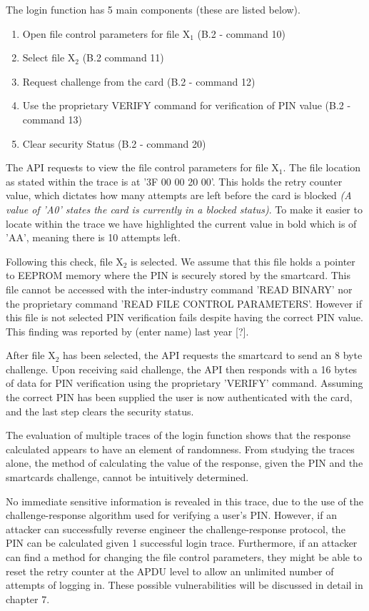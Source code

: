 \documentclass[bsc,frontabs,twoside,singlespacing,parskip,deptreport]{infthesis}     %
\begin{document}
The login function has 5 main components (these are listed below). 

\begin{enumerate}
\item Open file control parameters for file X$_1$ (B.2 - command 10)
\item Select file X$_2$ (B.2 command 11)
\item Request challenge from the card (B.2 - command 12)
\item Use the proprietary VERIFY command for verification of PIN value (B.2 - command 13)
\item Clear security Status (B.2 - command 20)\\
\end{enumerate}

The API requests to view the file control parameters for file X$_1$. The file location as stated within the trace is at '3F 00 00  20 00'. This holds the retry counter value, which dictates how many attempts are left before the card is blocked \textit{(A value of 'A0' states the card is currently in a blocked status)}. To make it easier to locate within the trace we have highlighted the current value in bold which is of 'AA', meaning there is 10 attempts left.

Following this check, file X$_2$ is selected. We assume that this file holds a pointer to EEPROM memory where the PIN is securely stored by the smartcard. This file cannot be accessed with the inter-industry command 'READ BINARY' nor the proprietary command 'READ FILE CONTROL PARAMETERS'. However if this file is not selected PIN verification fails despite having the correct PIN value. This finding was reported by (enter name) last year [?].

After file X$_2$ has been selected, the API requests the smartcard to send an 8 byte challenge. Upon receiving said challenge, the API then responds with a 16 bytes of data for PIN verification using the proprietary 'VERIFY' command. Assuming the correct PIN has been supplied the user is now authenticated with the card, and the last step clears the security status.

The evaluation of multiple traces of the login function shows that the response calculated appears to have an element of randomness. From studying the traces alone, the method of calculating the value of the response, given the PIN and the smartcards challenge, cannot be intuitively determined.

No immediate sensitive information is revealed in this trace, due to the use of the challenge-response algorithm used for verifying a user's PIN. However, if an attacker can successfully reverse engineer the challenge-response protocol, the PIN can be calculated given 1 successful login trace. Furthermore, if an attacker can find a method for changing the file control parameters, they might be able to reset the retry counter at the APDU level to allow an unlimited number of attempts of logging in. These possible vulnerabilities will be discussed in detail in chapter 7.
\end{document}
